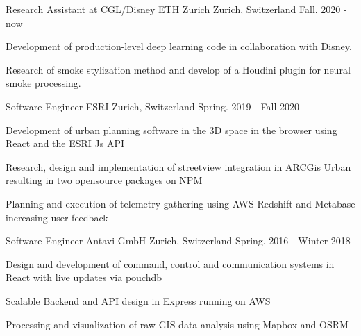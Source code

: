

\begin{cventries}
  \cventry
    {Research Assistant at CGL/Disney} %
    {ETH Zurich} %
    {Zurich, Switzerland} %
    {Fall. 2020 - now} %
    {
      \begin{cvitems} %
        \item {Development of production-level deep learning code in collaboration with Disney.}
        \item {Research of smoke stylization method and develop of a Houdini plugin for neural smoke processing.}
      \end{cvitems}
    }

  \cventry
    {Software Engineer} %
    {ESRI} %
    {Zurich, Switzerland} %
    {Spring. 2019 - Fall 2020} %
    {
      \begin{cvitems} %
        \item {Development of urban planning software in the 3D space in the browser using React and the ESRI Js API}
        \item {Research, design and implementation of streetview integration in ARCGis Urban resulting in two opensource packages on NPM}
        \item {Planning and execution of telemetry gathering using AWS-Redshift and Metabase increasing user feedback}
      \end{cvitems}
    }

  \cventry
    {Software Engineer} %
    {Antavi GmbH} %
    {Zurich, Switzerland} %
    {Spring. 2016 - Winter 2018} %
    {
      \begin{cvitems} %
        \item {Design and development of command, control and communication systems in React with live updates via pouchdb}
        \item {Scalable Backend and API design in Express running on AWS}
        \item {Processing and visualization of raw GIS data analysis using Mapbox and OSRM}
      \end{cvitems}
    }


\end{cventries}
